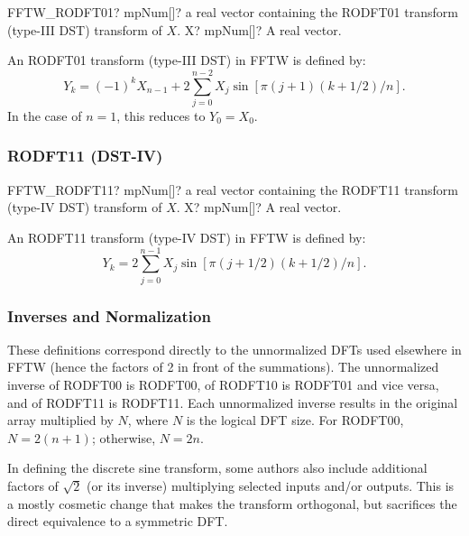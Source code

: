 \begin{mpFunctionsExtract}
	\mpFunctionOne
	{FFTW\_RODFT01? mpNum[]? a real vector containing the RODFT01 transform (type-III DST) transform of $X$.}
	{X? mpNum[]? A real vector.}
\end{mpFunctionsExtract}

An RODFT01 transform (type-III DST) in FFTW is defined by:
\begin{equation}
Y_k = (-1)^k X_{n-1} + 2 \sum^{n-2}_{j=0} X_j \sin[\pi (j+1)(k+1/2)/n].
\end{equation}
In the case of $n = 1$, this reduces to $Y_0 = X_0$. 




\subsubsection{RODFT11 (DST-IV)}

\begin{mpFunctionsExtract}
	\mpFunctionOne
	{FFTW\_RODFT11? mpNum[]? a real vector containing the RODFT11 transform (type-IV DST) transform of $X$.}
	{X? mpNum[]? A real vector.}
\end{mpFunctionsExtract}

An RODFT11 transform (type-IV DST) in FFTW is defined by:
\begin{equation}
Y_k = 2 \sum^{n-1}_{j=0} X_j \sin[\pi (j+1/2)(k+1/2)/n].
\end{equation}


\subsubsection{Inverses and Normalization}
These definitions correspond directly to the unnormalized DFTs used elsewhere in FFTW
(hence the factors of 2 in front of the summations). The unnormalized inverse of RODFT00
is RODFT00, of RODFT10 is RODFT01 and vice versa, and of RODFT11 is RODFT11. Each
unnormalized inverse results in the original array multiplied by $N$, where $N$ is the logical DFT size. For RODFT00, $N = 2(n + 1)$; otherwise, $N = 2n$.


In defining the discrete sine transform, some authors also include additional factors of
$\sqrt{2}$ (or its inverse) multiplying selected inputs and/or outputs. This is a mostly cosmetic change that makes the transform orthogonal, but sacrifices the direct equivalence to a symmetric DFT.









